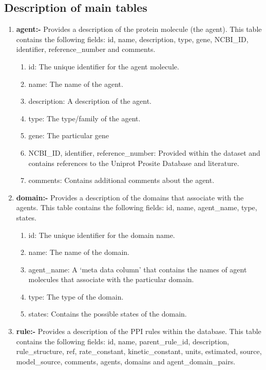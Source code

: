 \documentclass[msc,deptreport,ai]{infthesis}      %
\begin{document}
 \subsection{Description of  main tables}
\begin{enumerate}
	\item \textbf{agent:-} Provides a description of the protein molecule (the agent). This table contains the following fields: id, name, description, type, gene, NCBI\_ID, identifier, reference\_number and comments.
	\begin{enumerate}
		\item id: The unique identifier for the agent molecule.
		\item name: The name of the agent.
		\item description: A description of the agent.
		\item type: The type/family of the agent.
		\item gene: The particular gene
		\item NCBI\_ID, identifier, reference\_number: Provided within the dataset and contains references to the Uniprot Prosite Database \cite{Uniprot-Prosite} and literature.
		\item comments: Contains additional comments about the agent.
	\end{enumerate}
	\item \textbf{domain:-}  Provides a description of the domains that associate with the agents. This table contains the following fields: id, name, agent\_name, type, states. 	
		\begin{enumerate}
		\item id: The unique identifier for the domain name.
		\item name: The name of the domain.
		\item agent\_name: A `meta data column' that contains the names of agent molecules that associate with the particular domain.
		\item type: The type of the domain.
		\item states: Contains the possible states of the domain.
	\end{enumerate}
	\item \textbf{rule:-} Provides a description of the PPI rules within the database. 
	This table contains the following fields: id, name, parent\_rule\_id, description, rule\_structure, ref, rate\_constant, kinetic\_constant, units, estimated, source, model\_source, comments, agents, domains and agent\_domain\_pairs.
	\begin{enumerate}

\end{enumerate}
\end{enumerate}
\end{document}
